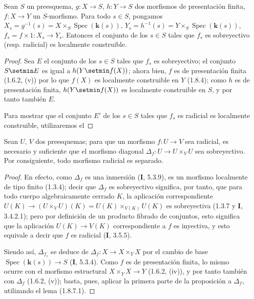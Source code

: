 
\begin{proposition}[1.8.7]
\label{IV.1.8.7-fr}
Sean $S$ un preesquema, $g:X\to S$, $h:Y\to S$ dos morfismos de
presentación finita, $f:X\to Y$ un $S$-morfismo. Para todo $s\in S$, pongamos
$X_s=g^{-1}(s)=X\times_S\operatorname{Spec}(\boldsymbol{k}(s))$,
$Y_s=h^{-1}(s)=Y\times_S\operatorname{Spec}(\boldsymbol{k}(s))$,
$f_s=f\times 1:X_s\to Y_s$. Entonces el conjunto de los $s\in S$ tales que $f_s$
es sobreyectivo (\textup{resp.} radicial) es localmente construible.
\end{proposition}

\begin{proof}
Sea $E$ el conjunto de los $s\in S$ tales que $f_s$ es sobreyectivo; el conjunto
$S\setmin E$ es igual a $h(Y\setmin f(X))$; ahora bien, $f$ es de presentación finita (1.6.2, (v))
por lo que $f(X)$ es localmente construible en $Y$ (1.8.4); como $h$ es de
presentación finita, $h(Y\setmin f(X))$ es localmente construible en $S$, y por tanto
también $E$.

Para mostrar que el conjunto $E'$ de los $s\in S$ tales que $f_s$ es radicial
es localmente construible, utilizaremos el
\end{proof}

\begin{lemma}[1.8.7.1]
Sean $U$, $V$ dos preesquemas; para que un morfismo $f:U\to V$ sea
radicial, es necesario y suficiente que el morfismo diagonal
$\Delta_f:U\to U\times_VU$ sea sobreyectivo. Por consiguiente, todo morfismo radicial
es separado.
\end{lemma}

\begin{proof}
En efecto, como $\Delta_f$ es una inmersión (\textbf{I}, 5.3.9), es un morfismo
localmente de tipo finito (1.3.4); decir que $\Delta_f$ es sobreyectivo significa,
por tanto, que para todo cuerpo algebraicamente cerrado $K$, la aplicación
correspondiente $U(K)\to(U\times_VU)(K)=U(K)\times_{V(K)}U(K)$ es sobreyectiva
(1.3.7 y \textbf{I}, 3.4.2.1); pero por definición de un producto fibrado de conjuntos,
esto significa que la aplicación $U(K)\to V(K)$ correspondiente a $f$ es
inyectiva, y esto equivale a decir que $f$ es radicial (\textbf{I}, 3.5.5).

Siendo así, $\Delta_{f_s}$ se deduce de $\Delta_f:X\to X\times_YX$ por el
cambio de base $\operatorname{Spec}(\boldsymbol{k}(s))\to S$ (\textbf{I}, 5.3.4). Como $f$
es de presentación finita, lo mismo ocurre con el morfismo estructural
$X\times_YX\to Y$ (1.6.2, (iv)), y por tanto también con $\Delta_f$ (1.6.2, (v));
basta, pues, aplicar la primera parte de la proposición a $\Delta_f$,
utilizando el lema (1.8.7.1).
\end{proof}

